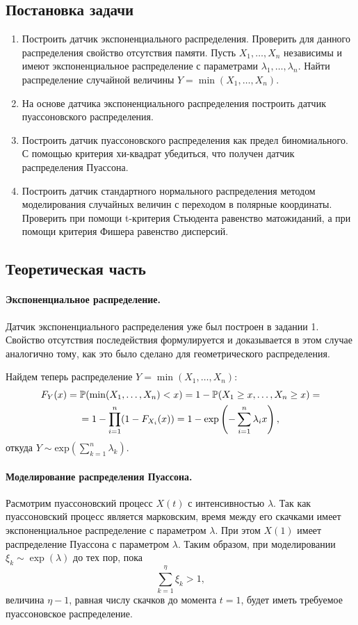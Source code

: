 \documentclass[16pt]{article}
\begin{document}
\subsection{Постановка задачи}
\begin{enumerate}
\item Построить датчик экспоненциального распределения. Проверить для данного распределения свойство отсутствия памяти. Пусть $X_1, \ldots, X_n$ независимы и имеют экспоненциальное распределение с параметрами $\lambda_1, \ldots, \lambda_n$. Найти распределение случайной величины $Y = \min(X_1, \ldots, X_n)$.
\item На основе датчика экспоненциального распределения построить датчик пуассоновского распределения.
\item Построить датчик пуассоновского распределения как предел биномиального. С помощью критерия хи-квадрат убедиться, что получен датчик распределения Пуассона.
\item Построить датчик стандартного нормального распределения методом моделирования случайных величин с переходом в полярные координаты. Проверить при помощи t-критерия Стьюдента равенство матожиданий, а при помощи критерия Фишера равенство дисперсий.
\end{enumerate}

\subsection{Теоретическая часть}
\paragraph{Экспоненциальное распределение.}
Датчик экспоненциального распределения уже был построен в задании 1. Свойство отсутствия последействия формулируется и доказывается в этом случае аналогично тому, как это было сделано для геометрического распределения.

Найдем теперь распределение $Y = \min(X_1, \ldots, X_n)$:
\begin{multline}\notag
F_Y(x) = \mathbb{P}(\min(X_1, \ldots, X_n) < x) = 1 - \mathbb{P}(X_1 \geq x, \ldots, X_n \geq x) =\\= 1 - \prod_{i=1}^n(1- F_{X_i}(x)) = 1 -\exp\left(-\sum\limits_{i=1}^n \lambda_i x\right),
\end{multline}
откуда $Y \sim \mathrm{exp}\left(\sum_{k=1}^n \lambda_k\right)$.

\paragraph{Моделирование распределения Пуассона.}
Расмотрим пуассоновский процесс $X(t)$ с интенсивностью $\lambda$. Так как пуассоновский процесс является марковским, время между его скачками имеет экспоненциальное распределение с параметром $\lambda$. При этом $X(1)$ имеет распределение Пуассона с параметром $\lambda$. Таким образом, при моделировании $\xi_k \sim \exp(\lambda)$ до тех пор, пока
$$\sum_{k=1}^\eta \xi_k > 1,$$
величина $\eta - 1$, равная числу скачков до момента $t = 1$, будет иметь требуемое пуассоновское распределение.
\end{document}
